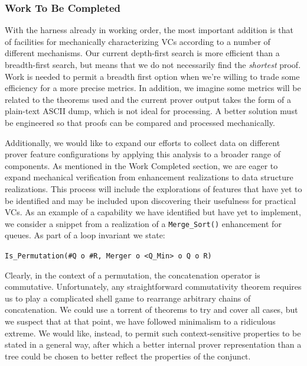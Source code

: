 \subsubsection{Work To Be Completed}
With the harness already in working order, the most important addition is that of facilities for mechanically characterizing VCs according to a number of different mechanisms.  Our current depth-first search is more efficient than a breadth-first search, but means that we do not necessarily find the \emph{shortest} proof.  Work is needed to permit a breadth first option when we're willing to trade some efficiency for a more precise metrics.  In addition, we imagine some metrics will be related to the theorems used and the current prover output takes the form of a plain-text ASCII dump, which is not ideal for processing.  A better solution must be engineered so that proofs can be compared and processed mechanically.

Additionally, we would like to expand our efforts to collect data on different prover feature configurations by applying this analysis to a broader range of components.  As mentioned in the Work Completed section, we are eager to expand mechanical verification from enhancement realizations to data structure realizations.  This process will include the explorations of features that have yet to be identified and may be included upon discovering their usefulness for practical VCs.  As an example of a capability we have identified but have yet to implement, we consider a snippet from a realization of a \texttt{Merge\_Sort()} enhancement for queues.  As part of a loop invariant we state:

\texttt{Is\_Permutation(\#Q o \#R, Merger o <Q\_Min> o Q o R)}

Clearly, in the context of a permutation, the concatenation operator is commutative.  Unfortunately, any straightforward commutativity theorem requires us to play a complicated shell game to rearrange arbitrary chains of concatenation.  We could use a torrent of theorems to try and cover all cases, but we suspect that at that point, we have followed minimalism to a ridiculous extreme.  We would like, instead, to permit such context-sensitive properties to be stated in a general way, after which a better internal prover representation than a tree could be chosen to better reflect the properties of the conjunct.


